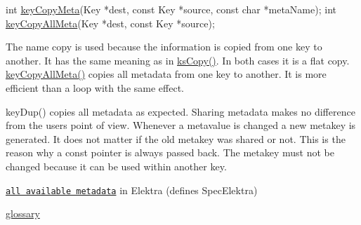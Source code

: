 \begin{DoxyCode}
\textcolor{keywordtype}{int} \hyperlink{group__keymeta_ga9a22b992478e613c8788bd460b4a1f0c}{keyCopyMeta}(Key *dest, \textcolor{keyword}{const} Key *source, \textcolor{keyword}{const} \textcolor{keywordtype}{char} *metaName);
\textcolor{keywordtype}{int} \hyperlink{group__keymeta_ga8e63720a65610a29597494d0671f9401}{keyCopyAllMeta}(Key *dest, \textcolor{keyword}{const} Key *source);
\end{DoxyCode}


The name {\ttfamily copy} is used because the information is copied from one key to another. It has the same meaning as in {\ttfamily \hyperlink{group__keyset_gaba1f1dbea191f4d7e7eb3e4296ae7d5e}{ks\+Copy()}}. In both cases it is a flat copy. {\ttfamily \hyperlink{group__keymeta_ga8e63720a65610a29597494d0671f9401}{key\+Copy\+All\+Meta()}} copies all metadata from one key to another. It is more efficient than a loop with the same effect.

{\ttfamily key\+Dup()} copies all metadata as expected. Sharing metadata makes no difference from the user\textquotesingle{}s point of view. Whenever a metavalue is changed a new metakey is generated. It does not matter if the old metakey was shared or not. This is the reason why a const pointer is always passed back. The metakey must not be changed because it can be used within another key.


\begin{DoxyItemize}
\item \href{/home/jenkins/workspace/libelektra-release/doc/METADATA.ini}{\tt all available metadata} in Elektra (defines Spec\+Elektra)
\item \hyperlink{doc_help_elektra-glossary_md}{glossary} 
\end{DoxyItemize}